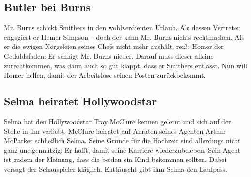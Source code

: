 	
\subsection{Butler bei Burns}\label{3F14}
Mr. Burns schickt Smithers in den wohlverdienten Urlaub. Als dessen Vertreter engagiert er Homer Simpson -- doch der kann Mr. Burns nichts rechtmachen. Als er die ewigen Nörgeleien seines Chefs nicht mehr aushält, reißt Homer der Geduldsfaden: Er schlägt Mr. Burns nieder. Darauf muss dieser alleine zurechtkommen, was dann auch so gut klappt, dass er Smithers entlässt. Nun will Homer helfen, damit der Arbeitslose seinen Posten zurückbekommt.

	
\subsection{Selma heiratet Hollywoodstar}\label{3F15}
Selma hat den Hollywoodstar Troy McClure kennen gelernt und sich auf der Stelle in ihn verliebt. McClure heiratet auf Anraten seines Agenten Arthur McParker schließlich Selma. Seine Gründe für die Hochzeit sind allerdings nicht ganz uneigennützig: Er hofft, damit seine Karriere wiederzubeleben. Sein Agent ist zudem der Meinung, dass die beiden ein Kind bekommen sollten. Dabei versagt der Schauspieler kläglich. Enttäuscht gibt ihm Selma den Laufpass.


